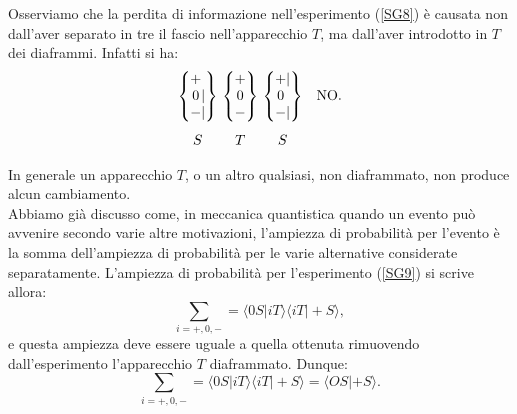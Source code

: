 \documentclass[a4paper,12pt,oneside]{book}
\begin{document}
Osserviamo che la perdita di informazione nell'esperimento (\ref{SG8}) è causata non dall'aver separato in tre il fascio nell'apparecchio $T$, ma dall'aver introdotto in $T$ dei diaframmi. Infatti si ha:
	\begin{equation}
		\begin{matrix}
		\begin{Bmatrix}
 			\makebox[\widthof{$-$}]{$+$}\makebox[\widthof{$|$}]{$\ $} \\ \makebox[\widthof{$-$}]{$0$}|\\ - | 
		\end{Bmatrix} \\[0.7cm]
			S
		\end{matrix} \
		\begin{matrix}
		\begin{Bmatrix}
			+ \\ 0 \\ - 
		\end{Bmatrix}  \\[0.7cm]
			T
		\end{matrix}\
		\begin{matrix}
		\begin{Bmatrix}
			\makebox[\widthof{$-$}]{$+$} | \\ \makebox[\widthof{$-$}]{$0$}\makebox[\widthof{$|$}]{$\ $}\\ - | 
		\end{Bmatrix} &\textrm{NO.} \\[0.7cm]
			S &
		\end{matrix}
	\label{SG9}
	\end{equation}


In generale un apparecchio $T$, o un altro qualsiasi, non diaframmato, non produce alcun cambiamento.\\

Abbiamo già discusso come, in meccanica quantistica quando un evento può avvenire secondo varie altre motivazioni, l'ampiezza di probabilità per l'evento è la somma dell'ampiezza di probabilità per le varie alternative considerate separatamente. L'ampiezza di probabilità per l'esperimento (\ref{SG9}) si scrive allora:
	\begin{equation}
		\sum\limits_{i=+,0,-}=\langle 0S | iT \rangle \langle iT | +S \rangle ,
	\end{equation}
e questa ampiezza deve essere uguale a quella ottenuta rimuovendo  dall'esperimento l'apparecchio $T$ diaframmato. Dunque:
	\begin{equation}
		\boxed{
			\sum\limits_{i=+,0,-}=\langle 0S | iT \rangle \langle iT | +S \rangle = \langle OS | +S \rangle .
			}
 	\label{cap3_2}
	\end{equation}
\end{document}
